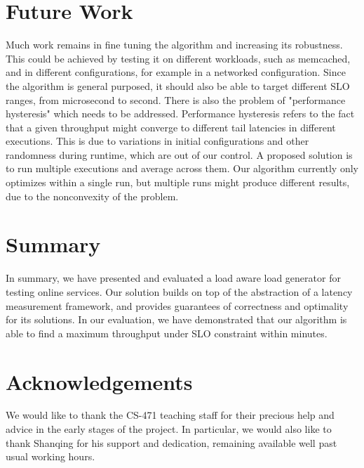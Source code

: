 \documentclass[10pt,conference,compsocconf]{IEEEtran}
\begin{document}
\section{Future Work}\label{future}

Much work remains in fine tuning the algorithm and increasing its robustness. This could be achieved by testing it on different workloads, such as memcached, and in different configurations, for example in a networked configuration. Since the algorithm is general purposed, it should also be able to target different SLO ranges, from microsecond to second. There is also the problem of "performance hysteresis" which needs to be addressed. Performance hysteresis refers to the fact that a given throughput might converge to different tail latencies in different executions. This is due to variations in initial configurations and other randomness during runtime, which are out of our control. A proposed solution is to run multiple executions and average across them. Our algorithm currently only optimizes within a single run, but multiple runs might produce different results, due to the nonconvexity of the problem.

\section{Summary} \label{sum}

In summary, we have presented and evaluated a load aware load generator for testing online services. Our solution builds on top of the abstraction of a latency measurement framework, and provides guarantees of correctness and optimality for its solutions. In our evaluation, we have demonstrated that our algorithm is able to find a maximum throughput under SLO constraint within minutes.

\section*{Acknowledgements}
We would like to thank the CS-471 teaching staff for their precious help and advice in the early stages of the project. In particular, we would also like to thank Shanqing for his support and dedication, remaining available well past usual working hours.

\singlespacing
\singlespacing


\end{document}

